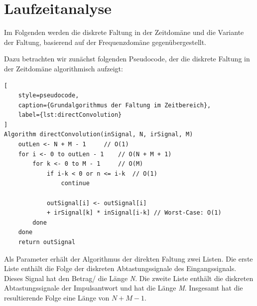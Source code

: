 \section{Laufzeitanalyse}
\label{sec:runtime_analysis}

Im Folgenden werden die diskrete Faltung in der Zeitdomäne und die Variante der Faltung,
basierend auf der Frequenzdomäne gegenübergestellt.

Dazu betrachten wir zunächst folgenden Pseudocode, der die diskrete Faltung in der
Zeitdomäne algorithmisch aufzeigt:




\begin{lstlisting}[
    style=pseudocode,
    caption={Grundalgorithmus der Faltung im Zeitbereich},
    label={lst:directConvolution}
]
Algorithm directConvolution(inSignal, N, irSignal, M)
    outLen <- N + M - 1     // O(1)
    for i <- 0 to outLen - 1    // O(N + M + 1)
        for k <- 0 to M - 1     // O(M)
            if i-k < 0 or n <= i-k  // O(1)
                continue
            
            outSignal[i] <- outSignal[i]
            + irSignal[k] * inSignal[i-k] // Worst-Case: O(1)
        done
    done
    return outSignal
\end{lstlisting}

Als Parameter erhält der Algorithmus der direkten Faltung zwei Listen.
Die erste Liste enthält die Folge der diskreten Abtastungssignale des Eingangssignals.
Dieses Signal hat den Betrag/ die Länge \textit{N}.
Die zweite Liste enthält die diskreten Abtastungssignale der Impulsantwort und hat die Länge \textit{M}.
Insgesamt hat die resultierende Folge eine Länge von $N + M - 1$.

